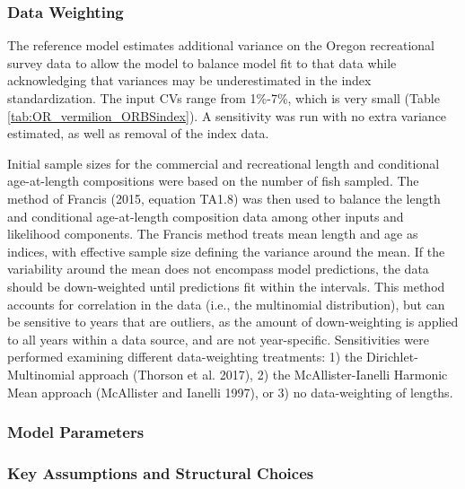 \documentclass[11pt,
  english,
  letterpaper,
]{article}
\begin{document}
\hypertarget{data-weighting}{%
\subsubsection{Data Weighting}\label{data-weighting}}

The reference model estimates additional variance on the Oregon recreational survey data to allow the model to balance model fit to that data while acknowledging that variances may be underestimated in the index standardization. The input CVs range from 1\%-7\%, which is very small (Table \ref{tab:OR_vermilion_ORBSindex}). A sensitivity was run with no extra variance estimated, as well as removal of the index data.

Initial sample sizes for the commercial and recreational length and conditional age-at-length compositions were based on the number of fish sampled. The method of Francis (2015, equation TA1.8) was then used to balance the length and conditional age-at-length composition data among other inputs and likelihood components. The Francis method treats mean length and age as indices, with effective sample size defining the variance around the mean. If the variability around the mean does not encompass model predictions, the data should be down-weighted until predictions fit within the intervals. This method accounts for correlation in the data (i.e., the multinomial distribution), but can be sensitive to years that are outliers, as the amount of down-weighting is applied to all years within a data source, and are not year-specific. Sensitivities were performed examining different data-weighting treatments: 1) the Dirichlet-Multinomial approach (Thorson et al. 2017), 2) the McAllister-Ianelli Harmonic Mean approach (McAllister and Ianelli 1997), or 3) no data-weighting of lengths.

\hypertarget{model-parameters}{%
\subsubsection{Model Parameters}\label{model-parameters}}

\hypertarget{key-assumptions-and-structural-choices}{%
\subsubsection{Key Assumptions and Structural Choices}\label{key-assumptions-and-structural-choices}}
\end{document}
